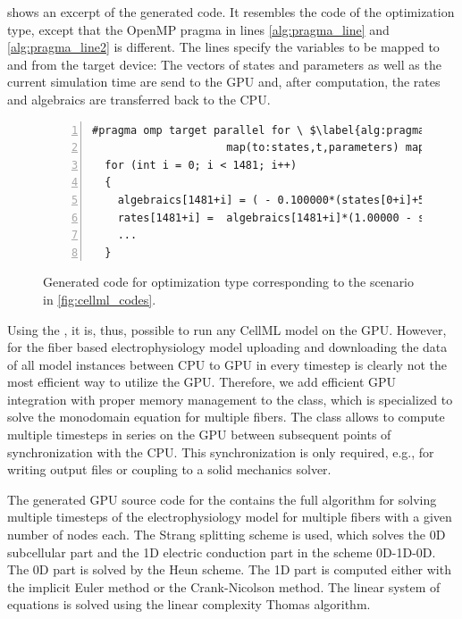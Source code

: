  shows an excerpt of the generated code. It resembles the code of the\break{} optimization type, except that the OpenMP pragma in lines \ref{alg:pragma_line} and \ref{alg:pragma_line2} is different. The lines specify the variables to be mapped to and from the target device: The vectors of states and parameters as well as the current simulation time  are send to the GPU and, after computation, the rates and algebraics are transferred back to the CPU.

\begin{figure}
\centering
\begin{framed}
\begin{lstlisting}[basicstyle=\footnotesize\ttfamily,commentstyle=\color{gray},numbers=left]
  #pragma omp target parallel for \ $\label{alg:pragma_line}$
                     map(to:states,t,parameters) map(from:rates,algebraics) $\label{alg:pragma_line2}$
  for (int i = 0; i < 1481; i++)
  {
    algebraics[1481+i] = ( - 0.100000*(states[0+i]+50.0000))/(exp(- (states[0+i]+5
    rates[1481+i] =  algebraics[1481+i]*(1.00000 - states[1481+i]) -  algebraics[7
    ...
  }
\end{lstlisting}
\end{framed}
\caption{Generated code for optimization type  corresponding to the scenario in \cref{fig:cellml_codes}.}%
\label{fig:cellml_codes_gpu}%
\end{figure}

Using the , it is, thus, possible to run any CellML model on the GPU. 
However, for the fiber based electrophysiology model uploading and downloading the data of all model instances between CPU to GPU in every timestep is clearly not the most efficient way to utilize the GPU. Therefore, we add efficient GPU integration with proper memory management to the  class, which is specialized to solve the monodomain equation for multiple fibers. The class allows to compute multiple timesteps in series on the GPU between subsequent points of synchronization with the CPU. This synchronization is only required, e.g., for writing output files or coupling to a solid mechanics solver.

The generated GPU source code for the  contains the full algorithm for solving multiple timesteps of the electrophysiology model for multiple fibers with a given number of nodes each. The Strang splitting scheme is used, which solves the 0D subcellular part and the 1D electric conduction part in the scheme 0D-1D-0D.
The 0D part is solved by the Heun scheme. The 1D part is computed either with the implicit Euler method or the Crank-Nicolson method. The linear system of equations is solved using the linear complexity Thomas algorithm.

